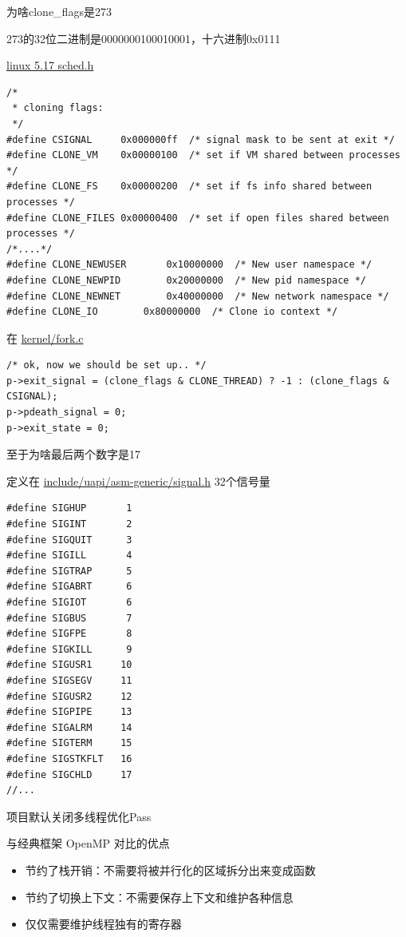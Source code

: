 \documentclass[a4paper]{exam}
\theoremstyle{definition}
\begin{document}
为啥clone\_flags是273

273的32位二进制是0000000100010001，十六进制0x0111

\href{https://elixir.bootlin.com/linux/v5.17/source/include/uapi/asm-generic/signal.h\#L18}{linux
5.17 sched.h}

\begin{verbatim}
/*
 * cloning flags:
 */
#define CSIGNAL		0x000000ff	/* signal mask to be sent at exit */
#define CLONE_VM	0x00000100	/* set if VM shared between processes */
#define CLONE_FS	0x00000200	/* set if fs info shared between processes */
#define CLONE_FILES	0x00000400	/* set if open files shared between processes */
/*....*/
#define CLONE_NEWUSER		0x10000000	/* New user namespace */
#define CLONE_NEWPID		0x20000000	/* New pid namespace */
#define CLONE_NEWNET		0x40000000	/* New network namespace */
#define CLONE_IO		0x80000000	/* Clone io context */
\end{verbatim}

在
\href{https://elixir.bootlin.com/linux/v5.17/source/kernel/fork.c\#L2502}{kernel/fork.c}

\begin{verbatim}
/* ok, now we should be set up.. */
p->exit_signal = (clone_flags & CLONE_THREAD) ? -1 : (clone_flags & CSIGNAL);
p->pdeath_signal = 0;
p->exit_state = 0;
\end{verbatim}
至于为啥最后两个数字是17

定义在
\href{https://elixir.bootlin.com/linux/v5.17/source/include/uapi/asm-generic/signal.h\#L18}{include/uapi/asm-generic/signal.h}
32个信号量
\begin{verbatim}
#define SIGHUP		 1
#define SIGINT		 2
#define SIGQUIT		 3
#define SIGILL		 4
#define SIGTRAP		 5
#define SIGABRT		 6
#define SIGIOT		 6
#define SIGBUS		 7
#define SIGFPE		 8
#define SIGKILL		 9
#define SIGUSR1		10
#define SIGSEGV		11
#define SIGUSR2		12
#define SIGPIPE		13
#define SIGALRM		14
#define SIGTERM		15
#define SIGSTKFLT	16
#define SIGCHLD		17
//...
\end{verbatim}

项目默认关闭多线程优化Pass

与经典框架 OpenMP 对比的优点

\begin{itemize}
\item
  节约了栈开销：不需要将被并行化的区域拆分出来变成函数
\item
  节约了切换上下文：不需要保存上下文和维护各种信息
\item
  仅仅需要维护线程独有的寄存器
\end{itemize}
\end{document}
